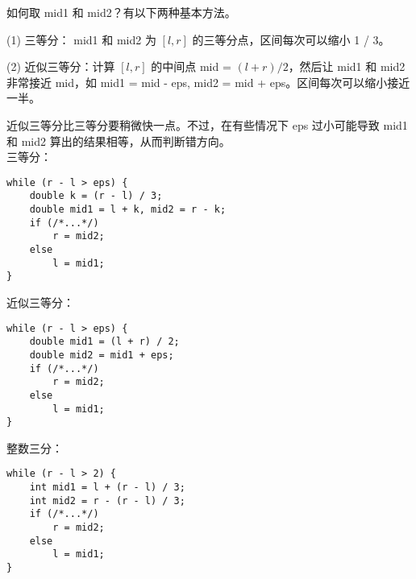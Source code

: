 如何取 mid1 和 mid2？有以下两种基本方法。

(1) 三等分： mid1 和 mid2 为 $[l, r]$ 的三等分点，区间每次可以缩小 1 / 3。

(2) 近似三等分：计算 $[l, r]$ 的中间点 mid = $(l + r) / 2$，然后让 mid1 和 mid2 非常接近 mid，如 mid1 = mid - eps, mid2 = mid + eps。区间每次可以缩小接近一半。

近似三等分比三等分要稍微快一点。不过，在有些情况下 eps 过小可能导致 mid1 和 mid2 算出的结果相等，从而判断错方向。
\\

三等分：
\begin{lstlisting}
while (r - l > eps) {
	double k = (r - l) / 3;
	double mid1 = l + k, mid2 = r - k;
	if (/*...*/)
		r = mid2;
	else
		l = mid1;
}
\end{lstlisting}

近似三等分：
\begin{lstlisting}
while (r - l > eps) {
	double mid1 = (l + r) / 2;
	double mid2 = mid1 + eps;
	if (/*...*/)
		r = mid2;
	else
		l = mid1;
}
\end{lstlisting}

整数三分：
\begin{lstlisting}
while (r - l > 2) {
	int mid1 = l + (r - l) / 3;
	int mid2 = r - (r - l) / 3;
	if (/*...*/)
		r = mid2;
	else
		l = mid1;
}
\end{lstlisting}